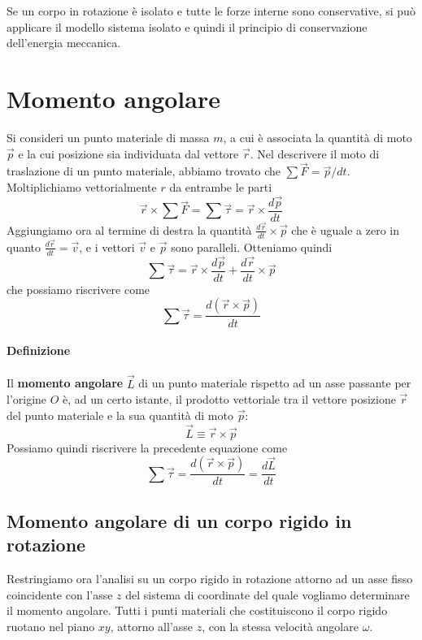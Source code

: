 \documentclass[a4paper,11pt,oneside]{book}
\begin{document}
Se un corpo in rotazione è isolato e tutte le forze interne sono conservative, si può applicare il modello sistema isolato
e quindi il principio di conservazione dell’energia meccanica.

\section{Momento angolare}
Si consideri un punto materiale di massa $m$, a cui è associata la quantità di moto $\vec{p}$ e la cui posizione sia individuata dal vettore $\vec{r}$.
Nel descrivere il moto di traslazione di un punto materiale, abbiamo trovato che $\sum \vec{F} = \vec{p}/dt$.
Moltiplichiamo vettorialmente $r$ da entrambe le parti
\begin{equation*}
    \vec{r} \times \sum \vec{F} = \sum \vec{\tau} = \vec{r} \times \frac{d\vec{p}}{dt}
\end{equation*}
Aggiungiamo ora al termine di destra la quantità $\tfrac{d\vec{r}}{dt}\times \vec{p}$ che è uguale a zero in quanto $\tfrac{d\vec{r}}{dt} = \vec{v}$,
e i vettori $\vec{v}$ e $\vec{p}$ sono paralleli. Otteniamo quindi
\begin{equation*}
    \sum \vec{\tau} = \vec{r} \times \frac{d\vec{p}}{dt} + \frac{d\vec{r}}{dt}\times \vec{p}
\end{equation*}
che possiamo riscrivere come
\begin{equation*}
    \sum \vec{\tau} = \frac{d(\vec{r} \times \vec{p})}{dt}
\end{equation*}

\paragraph{Definizione}
Il \textbf{momento angolare} $\vec{L}$ di un punto materiale rispetto ad un asse passante per l’origine $O$ è, ad un certo istante, il prodotto vettoriale 
tra il vettore posizione $\vec{r}$ del punto materiale e la sua quantità di moto $\vec{p}$:
\begin{equation*}
    \vec{L} \equiv \vec{r} \times \vec{p}
\end{equation*}
Possiamo quindi riscrivere la precedente equazione come
\begin{equation*}
    \sum \vec{\tau} = \frac{d(\vec{r} \times \vec{p})}{dt} = \frac{d\vec{L}}{dt}
\end{equation*}

\subsection{Momento angolare di un corpo rigido in rotazione}
Restringiamo ora l’analisi su un corpo rigido in rotazione attorno ad un asse fisso coincidente con l’asse $z$ del sistema
di coordinate del quale vogliamo determinare il momento angolare. Tutti i punti materiali che costituiscono il corpo rigido 
ruotano nel piano $xy$, attorno all’asse $z$, con la stessa velocità angolare $\omega$. 
\end{document}

